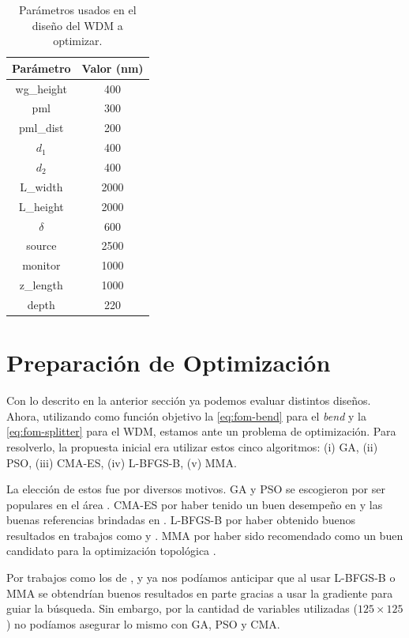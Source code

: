 \begin{table}[ht]
    \centering
    \begin{tabular}{|c|c|}
    \hline 
    Parámetro &  Valor (nm) \\
    \hline 
    wg\_height & 400 \\
    pml & 300 \\
    pml\_dist & 200 \\
    $d_1$ & 400 \\
    $d_2$ & 400 \\
    L\_width & 2000 \\
    L\_height & 2000 \\
    $\delta$ & 600 \\
    source & 2500 \\
    monitor & 1000 \\
    z\_length & 1000 \\
    depth & 220 \\
    \hline 
    \end{tabular}
    \caption{Parámetros usados en el diseño del WDM a optimizar.}
    \label{tab:wdm-values}
\end{table}


\section{Preparación de Optimización}

Con lo descrito en la anterior sección ya podemos evaluar distintos diseños.
Ahora, utilizando como función objetivo la \autoref{eq:fom-bend} para el \emph{bend} y 
la \autoref{eq:fom-splitter} para el WDM,
estamos ante un problema de optimización.
Para resolverlo, la propuesta inicial era utilizar estos cinco algoritmos:
(i) GA, (ii) PSO, (iii) CMA-ES, (iv) L-BFGS-B, (v) MMA.

La elección de estos fue por diversos motivos.
GA y PSO se escogieron por ser populares en el área \citep{Elsawy2020, Molesky2018, Prosopio-Galarza2019}.
CMA-ES por haber tenido un buen desempeño en \cite{Gregory2015} y las buenas referencias brindadas en
\cite{Campbell2019}.
L-BFGS-B por haber obtenido buenos resultados en trabajos como \cite{Su2020} y \cite{Zhang2021}.
MMA por haber sido recomendado como un buen candidato para la optimización topológica \citep{Lazarov2016}.

Por trabajos como los de \cite{Su2020}, \cite{Christiansen2021} y \cite{Lazarov2016} ya nos podíamos anticipar que al usar
L-BFGS-B o MMA se obtendrían buenos resultados en parte gracias a usar la gradiente para guiar la búsqueda.
Sin embargo, por la cantidad de variables utilizadas ($125 \times 125$) no podíamos asegurar lo mismo
con GA, PSO y CMA.

